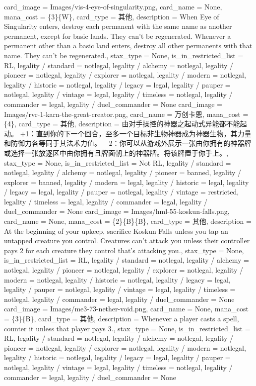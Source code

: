 \documentclass[lang = cn, color = black, 10pt]{AllThatStax}
\begin{document}
\card
{
	card_image = Images/vis-4-eye-of-singularity.png,
	card_name = None,
	mana_cost = \{3\}\{W\},
	card_type = 其他,
	description = When Eye of Singularity enters, destroy each permanent with the same name as another permanent, except for basic lands. They can't be regenerated.
	Whenever a permanent other than a basic land enters, destroy all other permanents with that name. They can't be regenerated.,
	stax_type = None,
	is_in_restricted_list = RL,
	legality / standard = notlegal,
	legality / alchemy = notlegal,
	legality / pioneer = notlegal,
	legality / explorer = notlegal,
	legality / modern = notlegal,
	legality / historic = notlegal,
	legality / legacy = legal,
	legality / pauper = notlegal,
	legality / vintage = legal,
	legality / timeless = notlegal,
	legality / commander = legal,
	legality / duel_commander = None
}
\card
{
	card_image = Images/rvr-1-karn-the-great-creator.png,
	card_name = 万创卡恩,
	mana_cost = \{4\},
	card_type = 其他,
	description = 由对手操控的神器之起动式异能都不能起动。
	+1：直到你的下一个回合，至多一个目标非生物神器成为神器生物，其力量和防御力各等同于其法术力值。
	−2：你可以从游戏外展示一张由你拥有的神器牌或选择一张放逐区中由你拥有且牌面朝上的神器牌。将该牌置于你手上。,
	stax_type = None,
	is_in_restricted_list = Not RL,
	legality / standard = notlegal,
	legality / alchemy = notlegal,
	legality / pioneer = banned,
	legality / explorer = banned,
	legality / modern = legal,
	legality / historic = legal,
	legality / legacy = legal,
	legality / pauper = notlegal,
	legality / vintage = restricted,
	legality / timeless = legal,
	legality / commander = legal,
	legality / duel_commander = None
}
\card
{
	card_image = Images/hml-55-koskun-falls.png,
	card_name = None,
	mana_cost = \{2\}\{B\}\{B\},
	card_type = 其他,
	description = At the beginning of your upkeep, sacrifice Koskun Falls unless you tap an untapped creature you control.
	Creatures can't attack you unless their controller pays {2} for each creature they control that's attacking you.,
	stax_type = None,
	is_in_restricted_list = RL,
	legality / standard = notlegal,
	legality / alchemy = notlegal,
	legality / pioneer = notlegal,
	legality / explorer = notlegal,
	legality / modern = notlegal,
	legality / historic = notlegal,
	legality / legacy = legal,
	legality / pauper = notlegal,
	legality / vintage = legal,
	legality / timeless = notlegal,
	legality / commander = legal,
	legality / duel_commander = None
}
\card
{
	card_image = Images/me3-73-nether-void.png,
	card_name = None,
	mana_cost = \{3\}\{B\},
	card_type = 其他,
	description = Whenever a player casts a spell, counter it unless that player pays {3}.,
	stax_type = None,
	is_in_restricted_list = RL,
	legality / standard = notlegal,
	legality / alchemy = notlegal,
	legality / pioneer = notlegal,
	legality / explorer = notlegal,
	legality / modern = notlegal,
	legality / historic = notlegal,
	legality / legacy = legal,
	legality / pauper = notlegal,
	legality / vintage = legal,
	legality / timeless = notlegal,
	legality / commander = legal,
	legality / duel_commander = None
}
\end{document}
